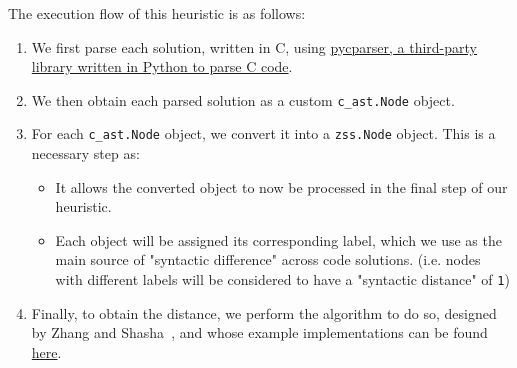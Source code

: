 The execution flow of this heuristic is as follows:
\begin{enumerate}
    \item We first parse each solution, written in C, using
          \href{https://github.com/eliben/pycparser}{pycparser, a third-party library written in Python
                to parse C code}.
    \item We then obtain each parsed solution as a custom \texttt{c\_ast.Node} object.
    \item For each \texttt{c\_ast.Node} object, we convert it into a \texttt{zss.Node} object.
          This is a necessary step as:
    \begin{itemize}
        \item It allows the converted object to now be processed in the final step of our heuristic.
        \item Each object will be assigned its corresponding label, which we use as the main source
              of "syntactic difference" across code solutions. (i.e. nodes with different labels
              will be considered to have a "syntactic distance" of \texttt{1})
    \end{itemize}
    \item Finally, to obtain the distance, we perform the algorithm to do so, designed by
          Zhang and Shasha~\cite{zhang1989simple}, and whose example implementations can be found
          \href{https://pythonhosted.org/zss/#module-zss}{here}.
\end{enumerate}